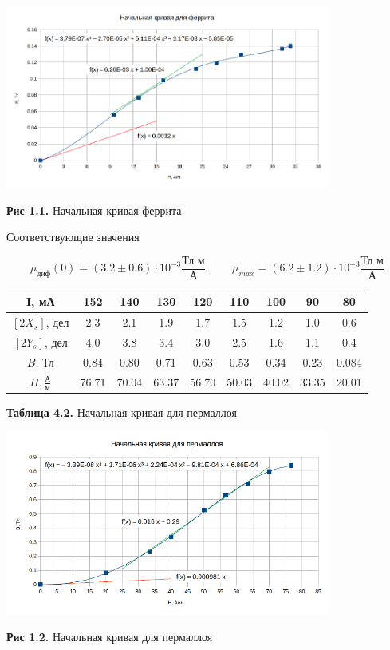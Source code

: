 \documentclass{article}
\begin{document}
\begin{center}
    \includegraphics[width = 0.8\textwidth]{curve_init_f.png}
    
    \textbf{Рис 1.1.} Начальная кривая феррита
\end{center}

Соответствующие значения 

\begin{equation*}
    \mu_{\text{диф}}(0) = (3.2 \pm 0.6) \cdot 10^{-3} \frac{\text{Тл м}}{\text{А}} \hspace{1cm} \mu_{max} = (6.2 \pm 1.2) \cdot 10^{-3} \frac{\text{Тл м}}{\text{А}}
\end{equation*}

\begin{center}
    \begin{tabular}{|c|c|c|c|c|c|c|c|c|}
        \hline
        I, мА & 152 & 140 & 130 & 120 & 110 & 100 & 90 & 80 \\
        \hline
        \([2X_{s}]\), дел & 2.3 & 2.1 & 1.9 & 1.7 & 1.5 & 1.2 & 1.0 & 0.6 \\
        \hline
        \([2Y_{s}]\), дел & 4.0 & 3.8 & 3.4	& 3.0 & 2.5	& 1.6 & 1.1 & 0.4 \\
        \hline
        \(B\), Тл & 0.84 & 0.80 & 0.71 & 0.63 & 0.53  & 0.34 & 0.23 & 0.084 \\
        \hline
        \(H, \frac{\text{А}}{\text{м}}\) & 76.71 & 70.04 & 63.37 & 56.70 & 50.03 & 40.02 & 33.35 & 20.01 \\
        \hline
    \end{tabular}
    
    \textbf{Таблица 4.2.} Начальная кривая для пермаллоя
\end{center}

\begin{center}
    \includegraphics[width=0.8\textwidth]{curve_init_p.png}
    
    \textbf{Рис 1.2.} Начальная кривая для пермаллоя 
\end{center}
\end{document}
